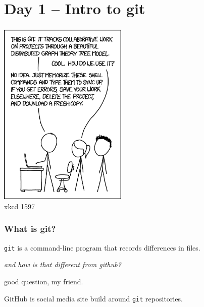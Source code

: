 \documentclass[14pt,aspectratio=1610]{beamer} %
\newcommand{\fframe}[2]{
   \begin{frame}
\frametitle{#1}
#2
\end{frame}
}
\begin{document}
\section{Day 1 -- Intro to git}

\fframe{}
{
	\begin{center}
\includegraphics[height=3.5in]{diagrams/git_2x.png}\\xkcd 1597
	\end{center}
}

\fframe{What is git?}
{
\begin{definition}
	{\tt git} is a command-line program that records differences in files.
\end{definition}
\vspace{\baselineskip}

	{\em and how is that different from github?}

\vspace{\baselineskip}
	good question, my friend.  
	\begin{definition}
	GitHub is social media site build around {\tt git} repositories.  
	\end{definition}
}
\end{document}
